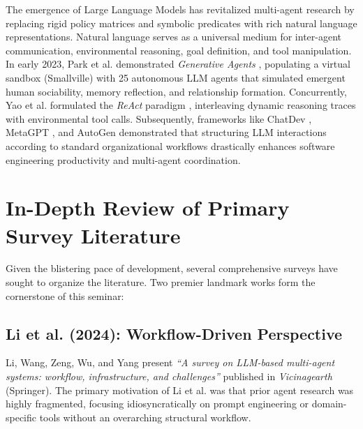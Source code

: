 \documentclass[12pt,a4paper]{report}
\begin{document}
The emergence of Large Language Models has revitalized multi-agent research by replacing rigid policy matrices and symbolic predicates with rich natural language representations. Natural language serves as a universal medium for inter-agent communication, environmental reasoning, goal definition, and tool manipulation. In early 2023, Park et al. demonstrated \textit{Generative Agents} \cite{park2023generative}, populating a virtual sandbox (Smallville) with 25 autonomous LLM agents that simulated emergent human sociability, memory reflection, and relationship formation. Concurrently, Yao et al. formulated the \textit{ReAct} paradigm \cite{yao2023react}, interleaving dynamic reasoning traces with environmental tool calls. Subsequently, frameworks like ChatDev \cite{qian2023communicative}, MetaGPT \cite{hong2023metagpt}, and AutoGen \cite{wu2023autogen} demonstrated that structuring LLM interactions according to standard organizational workflows drastically enhances software engineering productivity and multi-agent coordination.

\section{In-Depth Review of Primary Survey Literature}
Given the blistering pace of development, several comprehensive surveys have sought to organize the literature. Two premier landmark works form the cornerstone of this seminar:

\subsection{Li et al. (2024): Workflow-Driven Perspective}
Li, Wang, Zeng, Wu, and Yang \cite{li2024survey} present \textit{``A survey on LLM-based multi-agent systems: workflow, infrastructure, and challenges''} published in \textit{Vicinagearth} (Springer). The primary motivation of Li et al. was that prior agent research was highly fragmented, focusing idiosyncratically on prompt engineering or domain-specific tools without an overarching structural workflow. 
\end{document}
